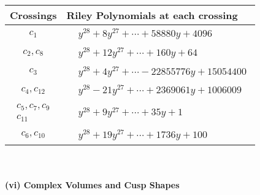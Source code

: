 \documentclass[1p]{elsarticle_modified}
\theoremstyle{definition}
\begin{document}
\begin{tabular}{m{50pt}|m{274pt}}
Crossings & \hspace{64pt}Riley Polynomials at each crossing \\
\hline $$\begin{aligned}c_{1}\end{aligned}$$&$\begin{aligned}
&y^{28}+8 y^{27}+\cdots+58880 y+4096
\end{aligned}$\\
\hline $$\begin{aligned}c_{2},c_{8}\end{aligned}$$&$\begin{aligned}
&y^{28}+12 y^{27}+\cdots+160 y+64
\end{aligned}$\\
\hline $$\begin{aligned}c_{3}\end{aligned}$$&$\begin{aligned}
&y^{28}+4 y^{27}+\cdots-22855776 y+15054400
\end{aligned}$\\
\hline $$\begin{aligned}c_{4},c_{12}\end{aligned}$$&$\begin{aligned}
&y^{28}-21 y^{27}+\cdots+2369061 y+1006009
\end{aligned}$\\
\hline $$\begin{aligned}c_{5},c_{7},c_{9}\\c_{11}\end{aligned}$$&$\begin{aligned}
&y^{28}+9 y^{27}+\cdots+35 y+1
\end{aligned}$\\
\hline $$\begin{aligned}c_{6},c_{10}\end{aligned}$$&$\begin{aligned}
&y^{28}+19 y^{27}+\cdots+1736 y+100
\end{aligned}$\\
\hline
\end{tabular}\\~\\
\newpage\flushleft \textbf{(vi) Complex Volumes and Cusp Shapes}
\end{document}
